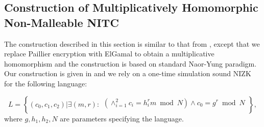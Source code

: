 \subsection{Construction of Multiplicatively Homomorphic Non-Malleable NITC}
\label{sec:multNITCstdmodel}
The construction described in this section is similar to that from , except that we replace Paillier encryption with ElGamal to obtain a multiplicative homomorphism and the construction is based on standard Naor-Yung paradigm. %
Our construction is given in  and we rely on a one-time simulation sound NIZK for the following language: 

\[
L = \left\{(c_0, c_1, c_2)| \exists (m,r):
\begin{aligned}
       (\land_{i=1}^2 c_i = h_i^{r}m \bmod N) \land
       c_0 = g^r \bmod N\\
    \end{aligned}
    \right\}, 
\]
where $g, h_1, h_2, N$ are parameters specifying the language.



